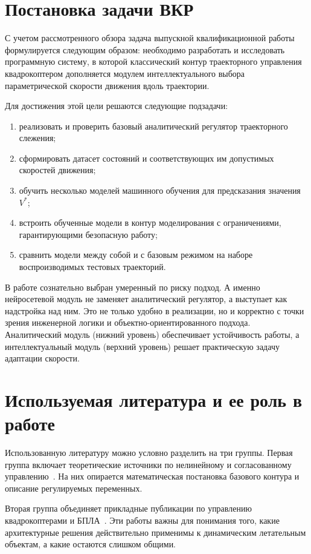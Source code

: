 \section{Постановка задачи ВКР}

С учетом рассмотренного обзора задача выпускной квалификационной работы формулируется следующим образом: необходимо разработать и исследовать программную систему, в которой классический контур траекторного управления квадрокоптером дополняется модулем интеллектуального выбора параметрической скорости движения вдоль траектории.

Для достижения этой цели решаются следующие подзадачи:
\begin{enumerate}
    \item реализовать и проверить базовый аналитический регулятор траекторного слежения;
    \item сформировать датасет состояний и соответствующих им допустимых скоростей движения;
    \item обучить несколько моделей машинного обучения для предсказания значения $V^{\ast}$;
    \item встроить обученные модели в контур моделирования с ограничениями, гарантирующими безопасную работу;
    \item сравнить модели между собой и с базовым режимом на наборе воспроизводимых тестовых траекторий.
\end{enumerate}

В работе сознательно выбран умеренный по риску подход.
А именно нейросетевой модуль не заменяет аналитический регулятор, а выступает как надстройка над ним.
Это не только удобно в реализации, но и корректно с точки зрения инженерной логики и объектно-ориентированного подхода.
Аналитический модуль (нижний уровень) обеспечивает устойчивость работы, а интеллектуальный модуль (верхний уровень) решает практическую задачу адаптации скорости.

\section{Используемая литература и ее роль в работе}

Использованную литературу можно условно разделить на три группы.
Первая группа включает теоретические источники по нелинейному и согласованному управлению~\cite{miroshnik2000,kim_algorithms,kim2024article}.
На них опирается математическая постановка базового контура и описание регулируемых переменных.

Вторая группа объединяет прикладные публикации по управлению квадрокоптерами и БПЛА~\cite{borisov2021,kim2023,madruga2021,kownacki2024}.
Эти работы важны для понимания того, какие архитектурные решения действительно применимы к динамическим летательным объектам, а какие остаются слишком общими.

